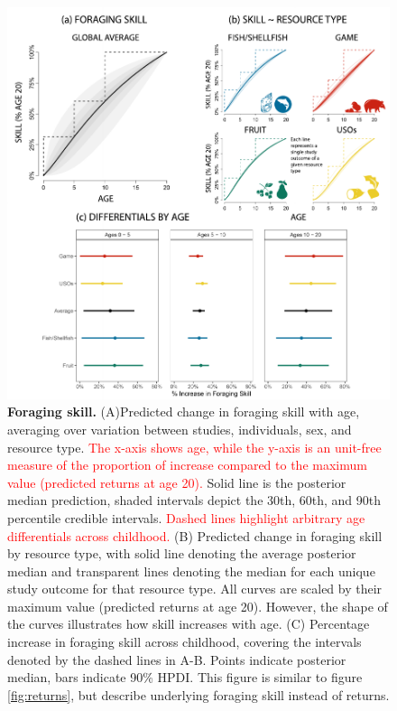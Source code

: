 \begin{figure}[h]
\centering
\includegraphics[width=12cm] {text/images/Figure_S5.pdf}
\renewcommand{\thefigure}{S\arabic{figure}}
\caption{\textbf{Foraging skill.} (A)Predicted change in foraging skill with age, averaging over variation between studies, individuals, sex, and resource type. \textcolor{red}{The x-axis shows age, while the y-axis is an unit-free measure of the proportion of increase compared to the maximum value (predicted returns at age 20).} Solid line is the posterior median prediction, shaded intervals depict the 30th, 60th, and 90th percentile credible intervals. \textcolor{red}{Dashed lines highlight arbitrary age differentials across childhood.} (B) Predicted change in foraging skill by resource type, with solid line denoting the average posterior median and transparent lines denoting the median for each unique study outcome for that resource type. All curves are scaled by their maximum value (predicted returns at age 20). However, the shape of the curves illustrates how skill increases with age. (C) Percentage increase in foraging skill across childhood, covering the intervals denoted by the dashed lines in A-B. Points indicate posterior median, bars indicate 90\% HPDI. This figure is similar to figure \ref{fig:returns}, but describe underlying foraging skill instead of returns.}
\label{fig:skill}
\end{figure}

